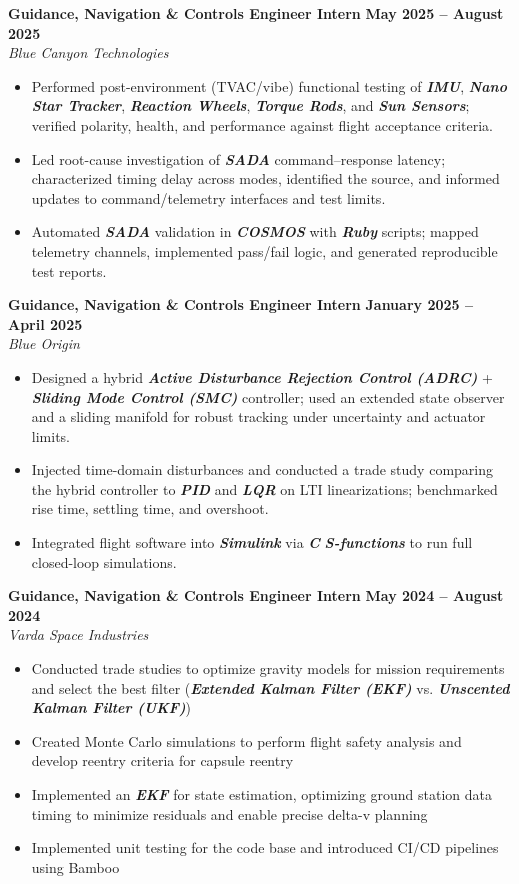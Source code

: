 \documentclass[10pt]{article}
\begin{document}
	\textbf{Guidance, Navigation \& Controls Engineer Intern} \hfill \textbf{May 2025 – August 2025} \\
	\emph{Blue Canyon Technologies}
	\begin{itemize}
		\item Performed post-environment (TVAC/vibe) functional testing of \textbf{\emph{IMU}}, \textbf{\emph{Nano Star Tracker}}, \textbf{\emph{Reaction Wheels}}, \textbf{\emph{Torque Rods}}, and \textbf{\emph{Sun Sensors}}; verified polarity, health, and performance against flight acceptance criteria.
		\item Led root-cause investigation of \textbf{\emph{SADA}} command–response latency; characterized timing delay across modes, identified the source, and informed updates to command/telemetry interfaces and test limits.
		\item Automated \textbf{\emph{SADA}} validation in \textbf{\emph{COSMOS}} with \textbf{\emph{Ruby}} scripts; mapped telemetry channels, implemented pass/fail logic, and generated reproducible test reports.
	\end{itemize}

	\textbf{Guidance, Navigation \& Controls Engineer Intern} \hfill \textbf{January 2025 – April 2025} \\
	\emph{Blue Origin}
	\begin{itemize}
		\item Designed a hybrid \textbf{\emph{Active Disturbance Rejection Control (ADRC)}} + \textbf{\emph{Sliding Mode Control (SMC)}} controller; used an extended state observer and a sliding manifold for robust tracking under uncertainty and actuator limits.
		\item Injected time-domain disturbances and conducted a trade study comparing the hybrid controller to \textbf{\emph{PID}} and \textbf{\emph{LQR}} on LTI linearizations; benchmarked rise time, settling time, and overshoot.
		\item Integrated flight software into \textbf{\emph{Simulink}} via \textbf{\emph{C}} \textbf{\emph{S-functions}} to run full closed-loop simulations.
	\end{itemize}

	\textbf{Guidance, Navigation \& Controls Engineer Intern} \hfill \textbf{May 2024 – August 2024} \\
	\emph{Varda Space Industries}
	\begin{itemize}
	    \item Conducted trade studies to optimize gravity models for mission requirements and select the best filter (\textbf{\emph{Extended Kalman Filter (EKF)}} vs. \textbf{\emph{Unscented Kalman Filter (UKF)}})
	    \item Created Monte Carlo simulations to perform flight safety analysis and develop reentry criteria for capsule reentry
	    \item Implemented an \textbf{\emph{EKF}} for state estimation, optimizing ground station data timing to minimize residuals and enable precise delta-v planning
	    \item Implemented unit testing for the code base and introduced CI/CD pipelines using Bamboo
	\end{itemize}
\end{document}
